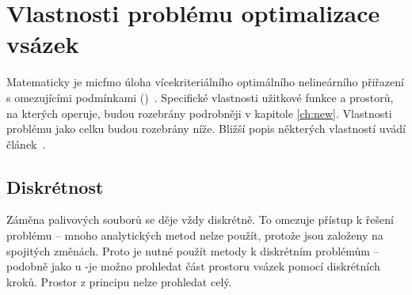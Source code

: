 


\section{Vlastnosti problému optimalizace vsázek}
\label{ch:vlastnosti}
Matematicky je \ac{micfmo} úloha vícekriteriálního optimálního 
nelineárního přiřazení s omezujícími podmínkami ()~\cite{roubalik}. Specifické vlastnosti užitkové funkce a prostorů, 
na kterých operuje, budou rozebrány podrobněji 
v kapitole \ref{ch:new}. Vlastnosti problému jako celku budou rozebrány níže. Bližší popis některých vlastností uvádí článek~\cite{stevens}.




\subsection{Diskrétnost}
\label{sec:diskretnost}
Záměna palivových souborů se děje vždy diskrétně. To omezuje přístup k řešení problému -- mnoho analytických metod 
nelze použít, protože jsou založeny na spojitých změnách. Proto je nutné použít metody k diskrétním problémům -- podobně 
jako u -je možno prohledat část prostoru vsázek pomocí diskrétních kroků. 
Prostor z principu nelze prohledat celý. 


